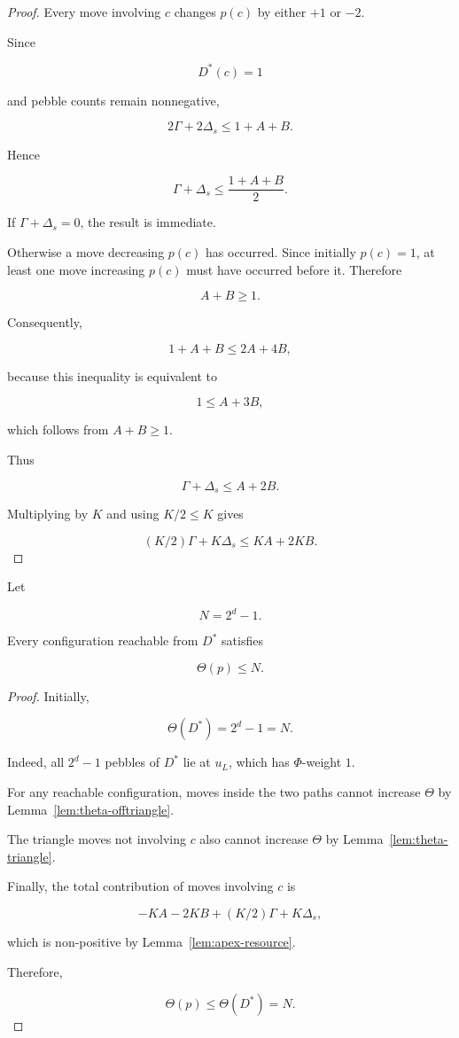 \begin{proof}

Every move involving $c$ changes $p(c)$ by either $+1$ or $-2$.

Since

\[
D^*(c)=1
\]

and pebble counts remain nonnegative,

\[
2\Gamma+2\Delta_s\le1+A+B .
\]

Hence

\[
\Gamma+\Delta_s\le\frac{1+A+B}{2}.
\]

If $\Gamma+\Delta_s=0$, the result is immediate.

Otherwise a move decreasing $p(c)$ has occurred. Since initially
$p(c)=1$, at least one move increasing $p(c)$ must have occurred before it.
Therefore

\[
A+B\ge1 .
\]

Consequently,

\[
1+A+B\le2A+4B,
\]

because this inequality is equivalent to

\[
1\le A+3B,
\]

which follows from $A+B\ge1$.

Thus

\[
\Gamma+\Delta_s\le A+2B .
\]

Multiplying by $K$ and using $K/2\le K$ gives

\[
(K/2)\Gamma+K\Delta_s\le KA+2KB .
\]

\end{proof}
\begin{lemma}
\label{lem:theta-bound}

Let

\[
N=2^d-1 .
\]

Every configuration reachable from $D^*$ satisfies

\[
\Theta(p)\le N .
\]

\end{lemma}



\begin{proof}

Initially,

\[
\Theta(D^*)=2^d-1=N .
\]

Indeed, all $2^d-1$ pebbles of $D^*$ lie at $u_L$, which has
$\Phi$-weight $1$.

For any reachable configuration, moves inside the two paths cannot increase
$\Theta$ by Lemma~\ref{lem:theta-offtriangle}.

The triangle moves not involving $c$ also cannot increase $\Theta$ by
Lemma~\ref{lem:theta-triangle}.

Finally, the total contribution of moves involving $c$ is

\[
-KA-2KB+(K/2)\Gamma+K\Delta_s ,
\]

which is non-positive by Lemma~\ref{lem:apex-resource}.

Therefore,

\[
\Theta(p)\le\Theta(D^*)=N .
\]

\end{proof}



